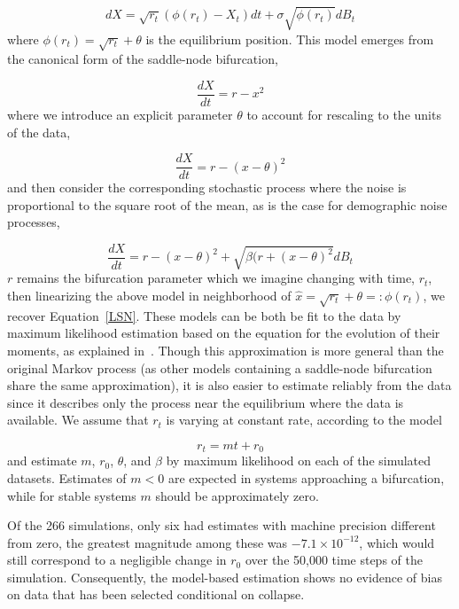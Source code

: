 \documentclass[authoryear,review,12pt]{elsarticle}
\begin{document}
\begin{equation}
  dX = \sqrt{ r_t } (\phi(r_t) - X_t) dt +
  \sigma\sqrt{\phi(r_t) } d B_t \label{LSN}
\end{equation}
where \( \phi(r_t) = \sqrt{r_t} +\theta \) is the equilibrium position.  
This model emerges from the canonical form of the saddle-node bifurcation,

\begin{equation}
  \frac{dX}{dt} = r - x^2
\end{equation}
where we introduce an explicit parameter $\theta$ to account for rescaling
to the units of the data,

\begin{equation}
   \frac{dX}{dt} = r - (x-\theta)^2
\end{equation}
and then consider the corresponding stochastic process where the noise is
proportional to the square root of the mean, as is the case for demographic
noise processes,

\begin{equation}
  \frac{dX}{dt} = r - (x-\theta)^2 + \sqrt{ \beta (r + (x-\theta)^2 } dB_t
\end{equation}
$r$ remains the bifurcation parameter which we imagine changing with time,
$r_t$, then linearizing the above model in neighborhood of
\(\hat x = \sqrt{r_t} +\theta =: \phi(r_t)\), we recover Equation~\eqref{LSN}.
These models can be both be fit to the data by maximum likelihood estimation
based on the equation for the evolution of their moments, as explained
in~\citet{Boettiger2012b}.  Though this approximation is more general than 
the original Markov process (as other models containing a saddle-node bifurcation
share the same approximation), it is also easier to estimate reliably from 
the data since it describes only the process near the equilibrium where the
data is available.  We assume that $r_t$ is varying at constant rate, 
according to the model

\begin{equation}
 r_t = m t + r_0 
\end{equation}
and estimate $m$, $r_0$, $\theta$, and $\beta$ by maximum likelihood on each
of the simulated datasets.  Estimates of $m < 0 $ are expected in systems 
approaching a bifurcation, while for stable systems $m$ should be approximately zero.


Of the 266 simulations, only six had estimates with machine precision different
from zero, the greatest magnitude among these was $-7.1 \times 10^{-12}$,
which would still correspond to a negligible change in $r_0$ over the 50,000 time steps
of the simulation.  Consequently, the model-based estimation shows no 
evidence of bias on data that has been selected conditional on collapse.   
\end{document}
